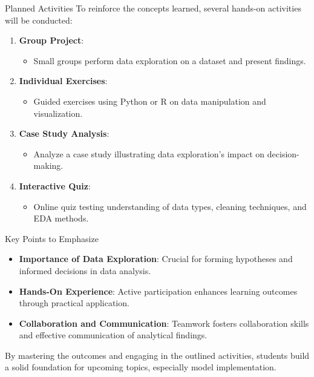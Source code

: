 \documentclass[aspectratio=169]{beamer}
\begin{document}
\begin{frame}[fragile]{Planned Activities}
    To reinforce the concepts learned, several hands-on activities will be conducted:
    
    \begin{enumerate}
        \item \textbf{Group Project}:
            \begin{itemize}
                \item Small groups perform data exploration on a dataset and present findings.
            \end{itemize}
        
        \item \textbf{Individual Exercises}:
            \begin{itemize}
                \item Guided exercises using Python or R on data manipulation and visualization.
            \end{itemize}

        \item \textbf{Case Study Analysis}:
            \begin{itemize}
                \item Analyze a case study illustrating data exploration's impact on decision-making.
            \end{itemize}
        
        \item \textbf{Interactive Quiz}:
            \begin{itemize}
                \item Online quiz testing understanding of data types, cleaning techniques, and EDA methods.
            \end{itemize}
    \end{enumerate}
\end{frame}

\begin{frame}[fragile]{Key Points to Emphasize}
    \begin{itemize}
        \item \textbf{Importance of Data Exploration}: Crucial for forming hypotheses and informed decisions in data analysis.
        \item \textbf{Hands-On Experience}: Active participation enhances learning outcomes through practical application.
        \item \textbf{Collaboration and Communication}: Teamwork fosters collaboration skills and effective communication of analytical findings.
    \end{itemize}
    
    By mastering the outcomes and engaging in the outlined activities, students build a solid foundation for upcoming topics, especially model implementation.
\end{frame}
\end{document}
